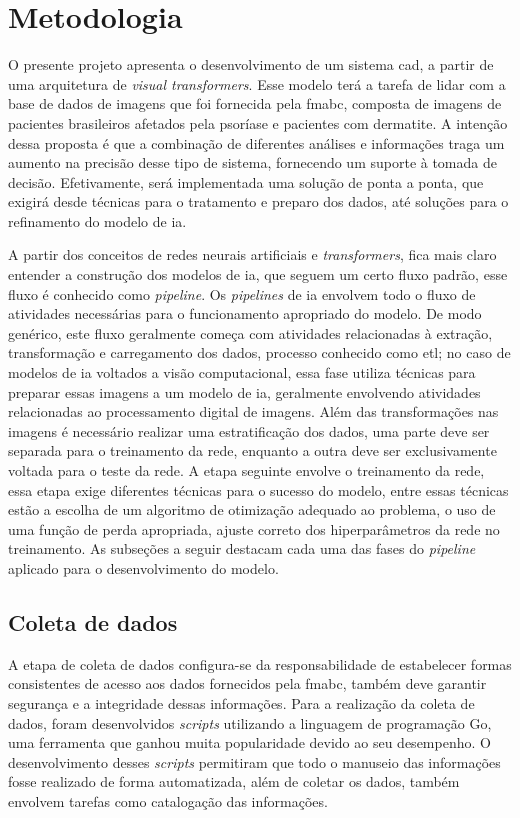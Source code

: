\section{Metodologia}

O presente projeto apresenta o desenvolvimento de um sistema \gls{cad}, a partir de uma arquitetura de \textit{visual transformers}. Esse modelo terá a tarefa de lidar com a base de dados de imagens que foi fornecida pela \gls{fmabc}, composta de imagens de pacientes brasileiros afetados pela psoríase e pacientes com dermatite. A intenção dessa proposta é que a combinação de diferentes análises e informações traga um aumento na precisão desse tipo de sistema, fornecendo um suporte à tomada de decisão. Efetivamente, será implementada uma solução de ponta a ponta, que exigirá desde técnicas para o tratamento e preparo dos dados, até soluções para o refinamento do modelo de \gls{ia}.

A partir dos conceitos de redes neurais artificiais e \textit{transformers}, fica mais claro entender a construção dos modelos de \gls{ia}, que seguem um certo fluxo padrão, esse fluxo é conhecido como \textit{pipeline}. Os \textit{pipelines} de \gls{ia} envolvem todo o fluxo de atividades necessárias para o funcionamento apropriado do modelo. De modo genérico, este fluxo geralmente começa com atividades relacionadas à extração, transformação e carregamento dos dados, processo conhecido como \gls{etl}; no caso de modelos de \gls{ia} voltados a visão computacional, essa fase utiliza técnicas para preparar essas imagens a um modelo de \gls{ia}, geralmente envolvendo atividades relacionadas ao processamento digital de imagens. Além das transformações nas imagens é necessário realizar uma estratificação dos dados, uma parte deve ser separada para o treinamento da rede, enquanto a outra deve ser exclusivamente voltada para o teste da rede. A etapa seguinte envolve o treinamento da rede, essa etapa exige diferentes técnicas para o sucesso do modelo, entre essas técnicas estão a escolha de um algoritmo de otimização adequado ao problema, o uso de uma função de perda apropriada, ajuste correto dos hiperparâmetros da rede no treinamento. As subseções a seguir destacam cada uma das fases do \textit{pipeline} aplicado para o desenvolvimento do modelo.

\subsection{Coleta de dados}

A etapa de coleta de dados configura-se da responsabilidade de estabelecer formas consistentes de acesso aos dados fornecidos pela \gls{fmabc}, também deve garantir segurança e a integridade dessas informações. Para a realização da coleta de dados, foram desenvolvidos \textit{scripts} utilizando a linguagem de programação Go, uma ferramenta que ganhou muita popularidade devido ao seu desempenho. O desenvolvimento desses \textit{scripts} permitiram que todo o manuseio das informações fosse realizado de forma automatizada, além de coletar os dados, também envolvem tarefas como catalogação das informações.


